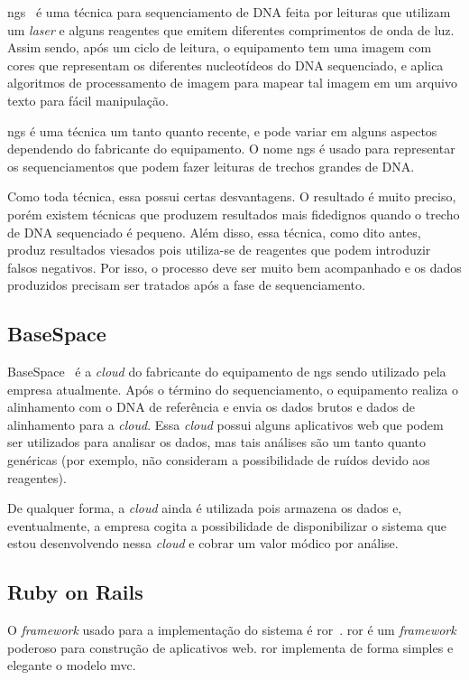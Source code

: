 \gls{ngs}~\cite{NGEN} é uma técnica para sequenciamento de DNA feita por leituras que utilizam um \textit{laser} e alguns reagentes que emitem
diferentes comprimentos de onda de luz. Assim sendo, após um ciclo de leitura, o equipamento tem uma imagem com cores que representam
os diferentes nucleotídeos do DNA sequenciado, e aplica algoritmos de processamento de imagem para mapear tal imagem em um arquivo
texto para fácil manipulação.

\gls{ngs} é uma técnica um tanto quanto recente, e pode variar em alguns aspectos dependendo do fabricante do equipamento. O nome \gls{ngs}
é usado para representar os sequenciamentos que podem fazer leituras de trechos grandes de DNA.

Como toda técnica, essa possui certas desvantagens. O resultado é muito preciso, porém existem técnicas que produzem resultados mais fidedignos
quando o trecho de DNA sequenciado é pequeno. Além disso, essa técnica, como dito antes, produz resultados viesados pois utiliza-se de reagentes
que podem introduzir falsos negativos. Por isso, o processo deve ser muito bem acompanhado e os dados produzidos precisam ser tratados após a fase de
sequenciamento.

\subsection{BaseSpace}

BaseSpace~\cite{BS} é a \textit{cloud} do fabricante do equipamento 
de \gls{ngs} sendo
utilizado pela empresa atualmente. Após o término do sequenciamento,
o equipamento realiza o alinhamento com o DNA de referência e envia os dados
brutos e dados de alinhamento para a \textit{cloud}. Essa \textit{cloud}
possui alguns aplicativos web que podem ser utilizados para analisar
os dados, mas tais análises são um tanto quanto genéricas (por exemplo, 
não consideram a possibilidade de ruídos devido aos reagentes).

De qualquer forma, a \textit{cloud} ainda é utilizada pois armazena os dados
e, eventualmente, a empresa cogita a possibilidade de disponibilizar o sistema
que estou desenvolvendo nessa \textit{cloud} e cobrar um valor módico por análise.

\subsection{Ruby on Rails}

O \textit{framework} usado para a implementação do sistema é \gls{ror}~\cite{RoR}.
\gls{ror} é um \textit{framework} poderoso para construção de aplicativos web. \gls{ror} implementa de forma simples e elegante
o modelo \gls{mvc}.

